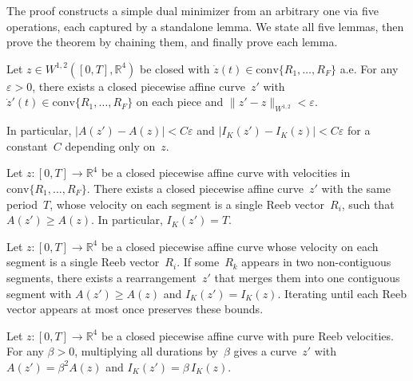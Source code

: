 The proof constructs a simple dual minimizer from an arbitrary one
via five operations, each captured by a standalone lemma.
We state all five lemmas, then prove the theorem by chaining them,
and finally prove each lemma.


\begin{lemma}\label{lem:pw-affine-approx}
Let $z \in W^{1,2}([0,T], \mathbb{R}^4)$ be closed
with $\dot{z}(t) \in \mathrm{conv}\{R_1, \ldots, R_F\}$ a.e.
For any $\varepsilon > 0$, there exists a closed
piecewise affine curve~$z'$ with
$\dot{z}'(t) \in \mathrm{conv}\{R_1, \ldots, R_F\}$ on each piece
and $\|z' - z\|_{W^{1,2}} < \varepsilon$.

In particular,
$|A(z') - A(z)| < C\varepsilon$ and
$|I_K(z') - I_K(z)| < C\varepsilon$
for a constant~$C$ depending only on~$z$.
\end{lemma}

\begin{lemma}\label{lem:splitting}
Let $z \colon [0,T] \to \mathbb{R}^4$ be a closed
piecewise affine curve with velocities in
$\mathrm{conv}\{R_1, \ldots, R_F\}$.
There exists a closed piecewise affine curve~$z'$
with the same period~$T$, whose velocity on each segment is a single
Reeb vector~$R_i$, such that
$A(z') \geq A(z)$.
In particular, $I_K(z') = T$.
\end{lemma}

\begin{lemma}\label{lem:merging}
Let $z \colon [0,T] \to \mathbb{R}^4$ be a closed piecewise affine
curve whose velocity on each segment is a single Reeb vector~$R_i$.
If some~$R_k$ appears in two non-contiguous segments, there
exists a rearrangement~$z'$ that merges them into one contiguous
segment with $A(z') \geq A(z)$ and $I_K(z') = I_K(z)$.
Iterating until each Reeb vector appears at most once preserves
these bounds.
\end{lemma}

\begin{lemma}[Rescaling]\label{lem:rescaling}
Let $z \colon [0,T] \to \mathbb{R}^4$ be a closed piecewise affine
curve with pure Reeb velocities.
For any $\beta > 0$, multiplying all durations by~$\beta$
gives a curve~$z'$ with
$A(z') = \beta^2 A(z)$ and $I_K(z') = \beta\, I_K(z)$.
\end{lemma}

